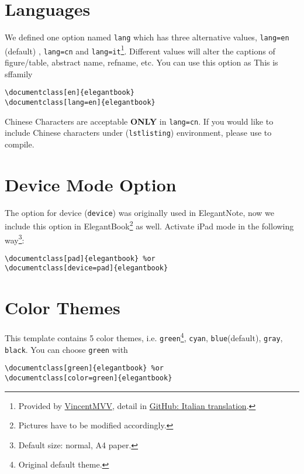 \documentclass[11pt,fancy,twocol]{elegantbook}
\begin{document}
\section{Languages}
We defined one option named \lstinline{lang} which has three alternative values, \lstinline{lang=en} (default) , \lstinline{lang=cn} and \lstinline{lang=it}\footnote{Provided by \href{https://github.com/VincentMVV}{VincentMVV}, detail in \href{https://github.com/ElegantLaTeX/ElegantBook/issues/85}{GitHub: Italian translation}.}. Different values will alter the captions of figure/table, abstract name, refname, etc. You can use this option as {\sffamily This is sffamily}
\begin{lstlisting}
\documentclass[en]{elegantbook} 
\documentclass[lang=en]{elegantbook}
\end{lstlisting}

\begin{remark}
Chinese Characters  are acceptable \textbf{ONLY} in \lstinline{lang=cn}. If you would like to include Chinese characters under (\lstinline{lstlisting}) environment, please use  to compile.
\end{remark}

\section{Device Mode Option}
The option for device (\lstinline{device}) was originally used in ElegantNote, now we include this option in ElegantBook\footnote{Pictures have to be modified accordingly.} as well. Activate iPad mode in the following way\footnote{Default size: normal, A4 paper.}:
\begin{lstlisting}
\documentclass[pad]{elegantbook} %or
\documentclass[device=pad]{elegantbook}
\end{lstlisting}

\section{Color Themes}
This template contains 5 color themes, i.e. \textcolor{structure1}{\lstinline{green}}\footnote{Original default theme.}, \textcolor{structure2}{\lstinline{cyan}}, \textcolor{structure3}{\lstinline{blue}}(default), \textcolor{structure4}{\lstinline{gray}}, \textcolor{structure5}{\lstinline{black}}. You can choose \lstinline{green} with
\begin{lstlisting}
\documentclass[green]{elegantbook} %or
\documentclass[color=green]{elegantbook}
\end{lstlisting}
\end{document}
